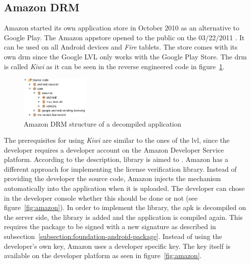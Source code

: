 \subsection{Amazon DRM} \label{section:license-amazon}
Amazon started its own application store in October 2010 \cite{amazonBeta} as an alternative to Google Play.
The Amazon appstore opened to the public on the 03/22/2011 \cite{amazonRelease}.
It can be used on all Android devices and \textit{Fire} tablets.
The store comes with its own \gls{drm} since the Google LVL only works with the Google Play Store.
The \gls{drm} is called \textit{Kiwi} as it can be seen in the reverse engineered code in figure~\ref{fig:amazonFolder}.
\newline
\begin{figure}[h]
    \centering
    \includegraphics[width=0.3\textwidth]{data/amazonFolder.png}
    \caption{Amazon DRM structure of a decompiled application}
    \label{fig:amazonFolder}
\end{figure}
\newline
The prerequisites for using \textit{Kiwi} are similar to the ones of the \gls{lvl}, since the developer requires a developer account on the Amazon Developer Service platform.
According to the description, library is aimed to \grqq \cite{amazonDeveloper}.
\newline
Amazon has a different approach for implementing the license verification library.
Instead of providing the developer the source code, Amazon injects the mechanism automatically into the application when it is uploaded.
The developer can chose in the developer console whether this should be done or not (see figure~\ref{fig:amazon}).
In order to implement the library, the \gls{apk} is decompiled on the server side, the library is added and the application is compiled again.
This requires the package to be signed with a new signature as described in subsection~\ref{subsection:foundation-android-package}.
Instead of using the developer's own key, Amazon uses a developer specific key.
The key itself is available on the developer platform as seen in figure~\ref{fig:amazon}. \cite{amazonDeveloper}
\newline
